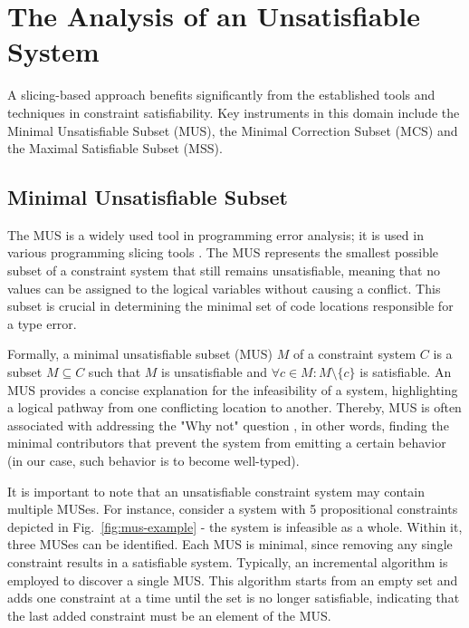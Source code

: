 \section{The Analysis of an Unsatisfiable System}

A slicing-based approach benefits significantly from the established tools and techniques in constraint satisfiability. Key instruments in this domain include the Minimal Unsatisfiable Subset (MUS), the Minimal Correction Subset (MCS) and the Maximal Satisfiable Subset (MSS).

\subsection*{Minimal Unsatisfiable Subset}

The MUS is a widely used tool in programming error analysis; it is used in various programming slicing tools \cite{Haack2004-fr, Pavlinovic2015-ke, Stuckey2003-pz}. The MUS represents the smallest possible subset of a constraint system that still remains unsatisfiable, meaning that no values can be assigned to the logical variables without causing a conflict. This subset is crucial in determining the minimal set of code locations responsible for a type error.


Formally, a minimal unsatisfiable subset (MUS) $M$ of a constraint system $C$ is a subset $M \subseteq C$ such that $M$ is unsatisfiable and $ \forall{c} \in M : M \setminus \{c\}$ is satisfiable.  An MUS provides a concise explanation for the infeasibility of a system, highlighting a logical pathway from one conflicting location to another. Thereby, MUS is often associated with addressing the "Why not" question \cite{Ignatiev2020-xu, Nelson2017-ar}, in other words, finding the minimal contributors that prevent the system from emitting a certain behavior (in our case, such behavior is to become well-typed).

It is important to note that an unsatisfiable constraint system may contain multiple MUSes. For instance, consider a system with 5 propositional constraints depicted in Fig.~\ref{fig:mus-example} - the system is infeasible as a whole. Within it, three MUSes can be identified. Each MUS is minimal, since removing any single constraint results in a satisfiable system. Typically, an incremental algorithm is employed to discover a single MUS. This algorithm starts from an empty set and adds one constraint at a time until the set is no longer satisfiable, indicating that the last added constraint must be an element of the MUS. 


